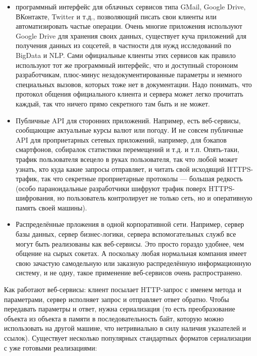 \documentclass{../../text-style}
\begin{document}
\begin{itemize}
    \item программный интерфейс для облачных сервисов типа GMail, Google Drive, ВКонтакте, Twitter и т.д., позволяющий писать свои клиенты или автоматизировать частые операции. Очень многие приложения используют Google Drive для хранения своих данных, существует куча приложений для получения данных из соцсетей, в частности для нужд исследований по BigData и NLP. Сами официальные клиенты этих сервисов как правило используют тот же программный интерфейс, что и доступный стороноим разработчикам, плюс-минус незадокументированные параметры и немного специальных вызовов, которых тоже нет в документации. Надо понимать, что протокол общения официального клиента и сервера может легко прочитать каждый, так что ничего прямо секретного там быть и не может.
    \item Публичные API для сторонних приложений. Например, есть веб-сервисы, сообщающие актуальные курсы валют или погоду. И не совсем публичные API для проприетарных сетевых приложений, например, для бэкапов смартфонов, собиралок статистики перемещений и т.д. и т.п. Опять-таки, трафик пользователя всецело в руках пользователя, так что любой может узнать, кто куда какие запросы отправляет, и читать свой исходящий HTTPS-трафик, так что секретные проприетарные протоколы --- большая редкость (особо параноидальные разработчики шифруют трафик поверх HTTPS-шифрования, но пользователь контролирует не только сеть, но и оперативную память своей машины).
    \item Распределённые прложения в одной корпоративной сети. Например, сервер базы данных, сервер бизнес-логики, сервера вспомогательных служб все могут быть реализованы как веб-сервисы. Это просто гораздо удобнее, чем общение на сырых сокетах. А поскольку любая нормальная компания имеет свою зачастую самодельную или заказную распределённую информационную систему, и не одну, такое применение веб-сервисов очень распространено.
\end{itemize}

Как работают веб-сервисы: клиент посылает HTTP-запрос с именем метода и параметрами, сервер исполняет запрос и отправляет ответ обратно. Чтобы передавать параметры и ответ, нужна сериализация (то есть преобразование объекта из объекта в памяти в последовательность байт, которую можно использовать на другой машине, что нетривиально в силу наличия указателей и ссылок). Существует несколько популярных стандартных форматов сериализации с уже готовыми реализациями:
\end{document}
